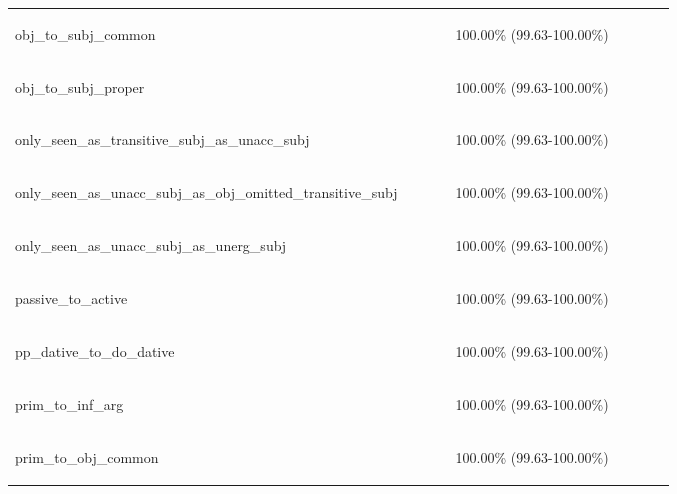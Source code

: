 \documentclass[11pt]{article}
\begin{document}
\begin{table}
\begin{tabular}{p{0.6\linewidth} p{0.3\linewidth}}
\begin{tiny}obj\_to\_subj\_common\end{tiny} & \begin{tiny} 100.00\% (99.63-100.00\%)\end{tiny} \\
\begin{tiny}obj\_to\_subj\_proper\end{tiny} & \begin{tiny} 100.00\% (99.63-100.00\%)\end{tiny} \\
\begin{tiny}only\_seen\_as\_transitive\_subj\_as\_unacc\_subj\end{tiny} & \begin{tiny} 100.00\% (99.63-100.00\%)\end{tiny} \\
\begin{tiny}only\_seen\_as\_unacc\_subj\_as\_obj\_omitted\_transitive\_subj\end{tiny} & \begin{tiny} 100.00\% (99.63-100.00\%)\end{tiny} \\
\begin{tiny}only\_seen\_as\_unacc\_subj\_as\_unerg\_subj\end{tiny} & \begin{tiny} 100.00\% (99.63-100.00\%)\end{tiny} \\
\begin{tiny}passive\_to\_active\end{tiny} & \begin{tiny} 100.00\% (99.63-100.00\%)\end{tiny} \\
\begin{tiny}pp\_dative\_to\_do\_dative\end{tiny} & \begin{tiny} 100.00\% (99.63-100.00\%)\end{tiny} \\
\begin{tiny}prim\_to\_inf\_arg\end{tiny} & \begin{tiny} 100.00\% (99.63-100.00\%)\end{tiny} \\
\begin{tiny}prim\_to\_obj\_common\end{tiny} & \begin{tiny} 100.00\% (99.63-100.00\%)\end{tiny} \\

\end{tabular}
\end{table}
\end{document}
